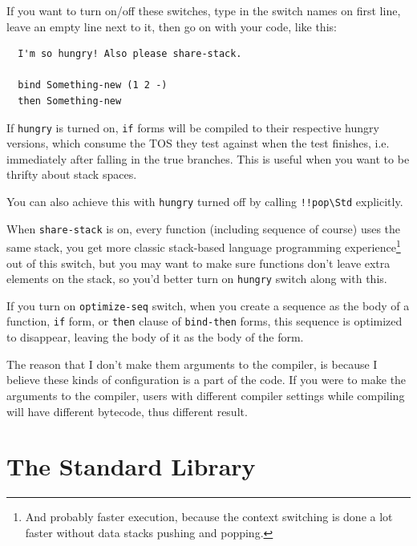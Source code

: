 \documentclass{report}
\newcommand{\mstd}[1]{\texttt{#1\textbackslash Std}}
\begin{document}
If you want to turn on/off these switches, type in the switch names on first line, leave an empty line next to it, then go on with your code, like this:
\begin{mdframed}[style=example]
\begin{verbatim}
  I'm so hungry! Also please share-stack.

  bind Something-new (1 2 -)
  then Something-new
\end{verbatim}
\end{mdframed}

If \texttt{hungry} is turned on, \texttt{if} forms will be compiled to their respective hungry versions, which consume the TOS they test against when the test finishes, i.e. immediately after falling in the true branches. This is useful when you want to be thrifty about stack spaces.

\begin{mdframed}[style=hint]
  You can also achieve this with \texttt{hungry} turned off by calling \mstd{!!pop} explicitly.
\end{mdframed}

When \texttt{share-stack} is on, every function (including sequence of course) uses the same stack, you get more classic stack-based language programming experience\footnote{And probably faster execution, because the context switching is done a lot faster without data stacks pushing and popping.} out of this switch, but you may want to make sure functions don't leave extra elements on the stack, so you'd better turn on \texttt{hungry} switch along with this.

If you turn on \texttt{optimize-seq} switch, when you create a sequence as the body of a function, \texttt{if} form, or \texttt{then} clause of \texttt{bind-then} forms, this sequence is optimized to disappear, leaving the body of it as the body of the form.

\begin{mdframed}[style=detail]
  The reason that I don't make them arguments to the compiler, is because I believe these kinds of configuration is a part of the code. If you were to make the arguments to the compiler, users with different compiler settings while compiling will have different bytecode, thus different result.
\end{mdframed}

\chapter{The Standard Library}
\end{document}
